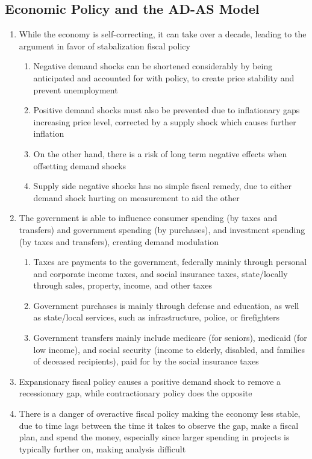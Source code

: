 \subsection{Economic Policy and the AD-AS Model}
\begin{enumerate}
\item While the economy is self-correcting, it can take over a decade, leading to the argument in favor of stabalization fiscal policy
\begin{enumerate}
\item Negative demand shocks can be shortened considerably by being anticipated and accounted for with policy, to create price stability and prevent unemployment
\item Positive demand shocks must also be prevented due to inflationary gaps increasing price level, corrected by a supply shock which causes further inflation
\item On the other hand, there is a risk of long term negative effects when offsetting demand shocks
\item Supply side negative shocks has no simple fiscal remedy, due to either demand shock hurting on measurement to aid the other
\end{enumerate}
\item The government is able to influence consumer spending (by taxes and transfers) and government spending (by purchases), and investment spending (by taxes and transfers), creating demand modulation
\begin{enumerate}
\item Taxes are payments to the government, federally mainly through personal and corporate income taxes, and social insurance taxes, state/locally through sales, property, income, and other taxes
\item Government purchases is mainly through defense and education, as well as state/local services, such as infrastructure, police, or firefighters
\item Government transfers mainly include medicare (for seniors), medicaid (for low income), and social security (income to elderly, disabled, and families of deceased recipients), paid for by the social insurance taxes
\end{enumerate}
\item Expansionary fiscal policy causes a positive demand shock to remove a recessionary gap, while contractionary policy does the opposite
\item There is a danger of overactive fiscal policy making the economy less stable, due to time lags between the time it takes to observe the gap, make a fiscal plan, and spend the money, especially since larger spending in projects is typically further on, making analysis difficult
\end{enumerate}

